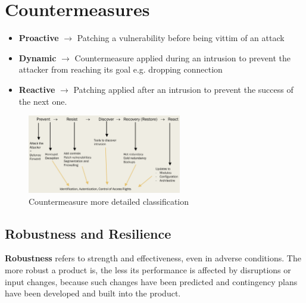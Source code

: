 \chapter{Countermeasures}
\begin{itemize}
    \item \textbf{Proactive} $\longrightarrow$ Patching a vulnerability before being vittim of an attack
    \item \textbf{Dynamic} $\longrightarrow$ Countermeasure applied during an intrusion to prevent the attacker from reaching its goal e.g. dropping connection
    \item \textbf{Reactive} $\longrightarrow$ Patching applied after an intrusion to prevent the success of the next one.
\end{itemize}

\begin{figure}[h]
    \centering
    \includegraphics[width=0.6\textwidth]{images/countermeasure_classification.png}
    \caption{Countermeasure more detailed classification}
    \label{fig:countermeasures_classification}
\end{figure}

\section{Robustness and Resilience}
\textbf{Robustness} refers to strength and effectiveness, even in adverse
conditions. The more robust a product is, the less its performance is
affected by disruptions or input changes, because such changes have
been predicted and contingency plans have been developed and built
into the product.

